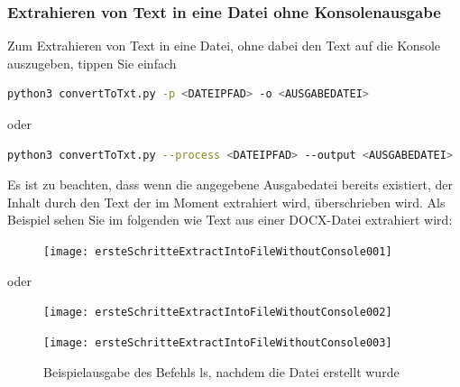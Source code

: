 \documentclass[12pt]{scrartcl}
\begin{document}
\subsubsection{Extrahieren von Text in eine Datei ohne Konsolenausgabe}
\label{sec:first-steps-extraction-file-without}
Zum Extrahieren von Text in eine Datei, ohne dabei den Text auf die Konsole auszugeben, tippen Sie einfach 
\begin{lstlisting}[language=bash]
python3 convertToTxt.py -p <DATEIPFAD> -o <AUSGABEDATEI>
\end{lstlisting}
\begin{center}
oder
\end{center}
\begin{lstlisting}[language=bash]
python3 convertToTxt.py --process <DATEIPFAD> --output <AUSGABEDATEI>
\end{lstlisting} 
Es ist zu beachten, dass wenn die angegebene Ausgabedatei bereits existiert, der Inhalt durch den Text der im Moment extrahiert wird, überschrieben wird. 
Als Beispiel sehen Sie im folgenden wie Text aus einer DOCX-Datei extrahiert wird:
\begin{figure}[htbp]
\texttt{[image: ersteSchritteExtractIntoFileWithoutConsole001]}\par\vspace{0.25cm}
\label{fig:ersteSchritteExtractIntoFileWithoutConsole001}
\end{figure}
\begin{center}
oder
\end{center}
\begin{figure}[htbp]
\texttt{[image: ersteSchritteExtractIntoFileWithoutConsole002]}\par

\vspace{0.25cm}
\label{fig:ersteSchritteExtractIntoFileWithoutConsole002}
\end{figure}
\begin{figure}[htbp]
\centering
\texttt{[image: ersteSchritteExtractIntoFileWithoutConsole003]}\par\vspace{0.25cm}
\caption{Beispielausgabe des Befehls ls, nachdem die Datei erstellt wurde}
\label{fig:ersteSchritteExtractIntoFileWithoutConsole003}
\end{figure}
\newpage
\end{document}
